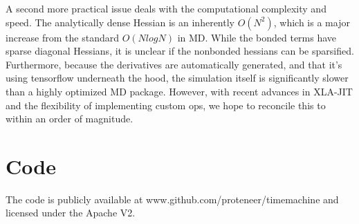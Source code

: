 \documentclass{article}
\begin{document}
A second more practical issue deals with the computational complexity and speed. The analytically dense Hessian is an inherently $O(N^2)$, which is a major increase from the standard $O(N log N)$ in MD. While the bonded terms have sparse diagonal Hessians, it is unclear if the nonbonded hessians can be sparsified. Furthermore, because the derivatives are automatically generated, and that it's using tensorflow underneath the hood, the simulation itself is significantly slower than a highly optimized MD package. However, with recent advances in XLA-JIT and the flexibility of implementing custom ops, we hope to reconcile this to within an order of magnitude.

\section{Code}

The code is publicly available at www.github.com/proteneer/timemachine and licensed under the Apache V2.
\end{document}
